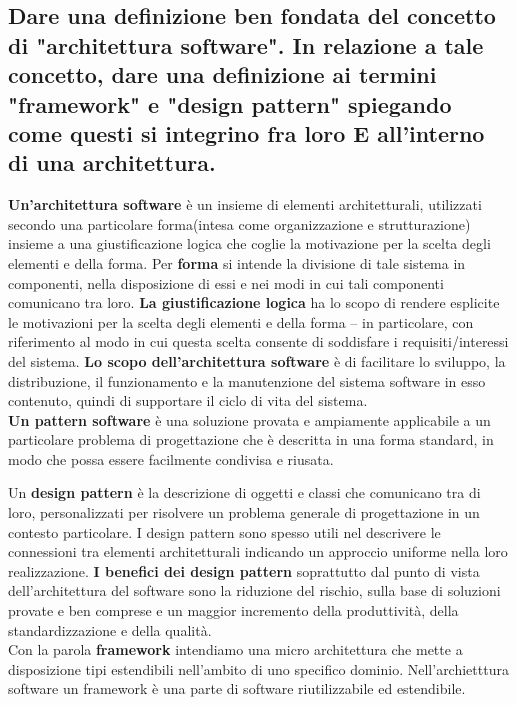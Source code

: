 \subsection{Dare una definizione ben fondata del concetto di "architettura software". In relazione a tale concetto, dare una definizione ai termini "framework" e "design pattern" spiegando come questi si integrino fra loro E all'interno di una architettura. }

\textbf{Un'architettura software} è un insieme di elementi architetturali, utilizzati secondo una particolare forma(intesa come organizzazione e strutturazione) insieme a una giustificazione logica che coglie la motivazione per la scelta degli elementi e della forma. Per  \textbf{forma} si intende la divisione di tale sistema in componenti, nella disposizione di essi e nei modi in cui tali componenti comunicano tra loro. \textbf{La giustificazione logica} ha lo scopo di rendere esplicite le motivazioni per la scelta degli elementi e della forma – in particolare, con riferimento al modo in cui questa scelta consente di soddisfare i requisiti/interessi del sistema.
\textbf{Lo scopo dell'architettura software} è di facilitare lo sviluppo, la distribuzione, il funzionamento e la manutenzione del sistema software in esso contenuto, quindi di supportare il ciclo di vita del sistema. \\

\textbf{Un pattern software} è una soluzione provata e ampiamente applicabile a un particolare problema di progettazione che è descritta in una forma standard, in modo che possa essere facilmente condivisa e riusata. 

Un \textbf{design pattern} è la descrizione di oggetti e classi che comunicano tra di loro, personalizzati per risolvere un problema generale di progettazione in un contesto particolare. I design pattern sono spesso utili nel descrivere le connessioni tra elementi architetturali indicando un approccio uniforme nella loro realizzazione.
\textbf{I benefici dei design pattern} soprattutto dal punto di vista dell’architettura del software sono la riduzione del rischio, sulla base di soluzioni provate e ben comprese e un maggior incremento della produttività, della standardizzazione e della qualità. \\

Con la parola \textbf{framework} intendiamo una micro architettura che mette a disposizione tipi estendibili nell'ambito di uno specifico dominio. Nell'archietttura software un framework è una parte di software riutilizzabile ed estendibile.